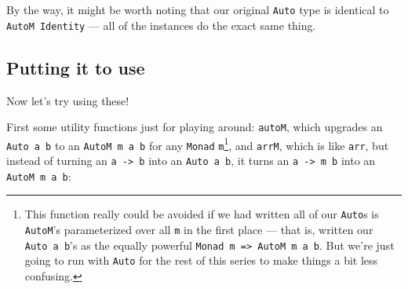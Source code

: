 \documentclass[]{article}
\newenvironment{Shaded}{}{}
\newcommand{\CommentTok}[1]{\textcolor[rgb]{0.38,0.63,0.69}{\textit{#1}}}
\newcommand{\DataTypeTok}[1]{\textcolor[rgb]{0.56,0.13,0.00}{#1}}
\newcommand{\FunctionTok}[1]{\textcolor[rgb]{0.02,0.16,0.49}{#1}}
\newcommand{\KeywordTok}[1]{\textcolor[rgb]{0.00,0.44,0.13}{\textbf{#1}}}
\newcommand{\NormalTok}[1]{#1}
\newcommand{\OperatorTok}[1]{\textcolor[rgb]{0.40,0.40,0.40}{#1}}
\newcommand{\OtherTok}[1]{\textcolor[rgb]{0.00,0.44,0.13}{#1}}
\begin{document}
By the way, it might be worth noting that our original \texttt{Auto} type is
identical to \texttt{AutoM\ Identity} --- all of the instances do the exact same
thing.

\hypertarget{putting-it-to-use}{%
\subsection{Putting it to use}\label{putting-it-to-use}}

Now let's try using these!

First some utility functions just for playing around: \texttt{autoM}, which
upgrades an \texttt{Auto\ a\ b} to an \texttt{AutoM\ m\ a\ b} for any
\texttt{Monad} \texttt{m}\footnote{This function really could be avoided if we
  had written all of our \texttt{Auto}s is \texttt{AutoM}'s parameterized over
  all \texttt{m} in the first place --- that is, written our
  \texttt{Auto\ a\ b}'s as the equally powerful
  \texttt{Monad\ m\ =\textgreater{}\ AutoM\ m\ a\ b}. But we're just going to
  run with \texttt{Auto} for the rest of this series to make things a bit less
  confusing.}, and \texttt{arrM}, which is like \texttt{arr}, but instead of
turning an \texttt{a\ -\textgreater{}\ b} into an \texttt{Auto\ a\ b}, it turns
an \texttt{a\ -\textgreater{}\ m\ b} into an \texttt{AutoM\ m\ a\ b}:

\begin{Shaded}
\end{Shaded}
\end{document}
